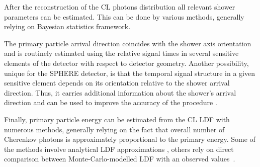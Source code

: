 \documentclass[a4paper,11pt]{article}
\begin{document}


After the reconstruction of the CL photons distribution all relevant shower parameters can be estimated. This can be done by various methods, generally relying on Bayesian statistics framework.

The primary particle arrival direction coincides with the shower axis orientation and is routinely estimated using the relative signal times in several sensitive elements of the detector with respect to detector geometry. Another possibility, unique for the SPHERE detector, is that the temporal signal structure in a given sensitive element depends on its orientation relative to the shower arrival direction. Thus, it carries additional information about the shower's arrival direction and can be used to improve the accuracy of the procedure \cite{Antonov2020}.


Finally, primary particle energy can be estimated from the CL LDF with numerous methods, generally relying on the fact that overall number of Cherenkov photons is approximately proportional to the primary energy. Some of the methods involve analytical LDF approximations \cite[e.g.][]{AlRubaiee2014}, others rely on direct comparison between Monte-Carlo-modelled LDF with an observed values~\cite{Antonov2015}.

\end{document}
